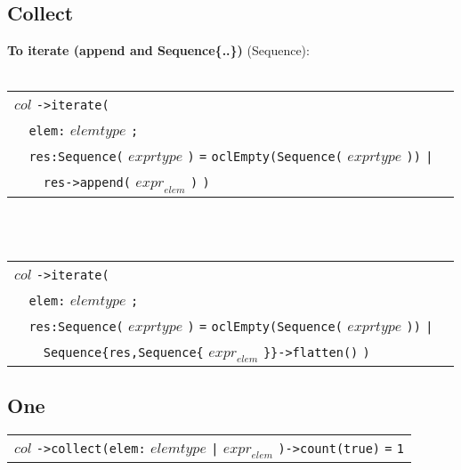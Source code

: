 \subsection{Collect}
{\bf To iterate (append and Sequence\{..\})} (Sequence):\\\\
\begin{tabular}{ll}
$\mathit{col}$ \verb+->iterate(+&\\
\verb+  +\verb+elem+\verb+:+ $\mathit{elemtype}$ \verb+;+\\
\verb+  +\verb+res+\verb+:Sequence(+ $\mathit{exprtype}$ \verb+)+
\verb+=+
\verb+oclEmpty(Sequence(+ $\mathit{exprtype}$ \verb+))+ \verb+|+\\
\verb+  +\verb+  +\verb+res+\verb+->append(+
$\mathit{expr}_{\mathit{elem}}$ \verb+)+ \verb+)+
\end{tabular}\\\\
\begin{tabular}{ll}
$\mathit{col}$ \verb+->iterate(+&\\
\verb+  +\verb+elem+\verb+:+ $\mathit{elemtype}$ \verb+;+\\
\verb+  +\verb+res+\verb+:Sequence(+ $\mathit{exprtype}$ \verb+)+
\verb+=+
\verb+oclEmpty(Sequence(+ $\mathit{exprtype}$ \verb+))+ \verb+|+\\
\verb+  +\verb+  +\verb+Sequence{res,Sequence{+
$\mathit{expr}_{\mathit{elem}}$ \verb+}}->flatten()+ \verb+)+
\end{tabular}
\subsection{One}
\begin{tabular}{l}
$\mathit{col}$ \verb+->collect(+\verb+elem+\verb+:+
$\mathit{elemtype}$ \verb+|+ $\mathit{expr}_{\mathit{elem}}$
\verb+)->count(true)+ \verb+=+ \verb+1+
\end{tabular}\\\\

